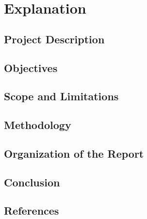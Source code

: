 \chapter{Explanation}
\label{ch:introduction}

\section{Project Description}
\label{sec:project-description}



\section{Objectives}
\label{sec:objectives}



\section{Scope and Limitations}
\label{sec:scope-limitations}



\section{Methodology}
\label{sec:methodology}



\section{Organization of the Report}
\label{sec:organization-report}



\section{Conclusion}
\label{sec:conclusion}



\section*{References}
\label{sec:references}

